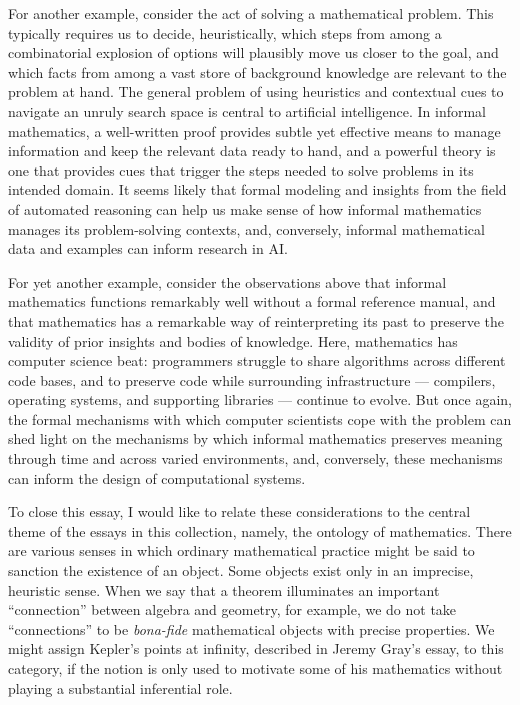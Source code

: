 \documentclass[11pt]{article}
\begin{document}
For another example, consider the act of solving a mathematical problem. This typically requires us to decide, heuristically, which steps from among a combinatorial explosion of options will plausibly move us closer to the goal, and which facts from among a vast store of background knowledge are relevant to the problem at hand. The general problem of using heuristics and contextual cues to navigate an unruly search space is central to artificial intelligence. In informal mathematics, a well-written proof provides subtle yet effective means to manage information and keep the relevant data ready to hand, and a powerful theory is one that provides cues that trigger the steps needed to solve problems in its intended domain. It seems likely that formal modeling and insights from the field of automated reasoning can help us make sense of how informal mathematics manages its problem-solving contexts, and, conversely, informal mathematical data and examples can inform research in AI.

For yet another example, consider the observations above that informal mathematics functions remarkably well without a formal reference manual, and that mathematics has a remarkable way of reinterpreting its past to preserve the validity of prior insights and bodies of knowledge. Here, mathematics has computer science beat: programmers struggle to share algorithms across different code bases, and to preserve code while surrounding infrastructure --- compilers, operating systems, and supporting libraries --- continue to evolve. But once again, the formal mechanisms with which computer scientists cope with the problem can shed light on the mechanisms by which informal mathematics preserves meaning through time and across varied environments, and, conversely, these mechanisms can inform the design of computational systems.

To close this essay, I would like to relate these considerations to the central theme of the essays in this collection, namely, the ontology of mathematics. There are various senses in which ordinary mathematical practice might be said to sanction the existence of an object. Some objects exist only in an imprecise, heuristic sense. When we say that a theorem illuminates an important ``connection'' between algebra and geometry, for example, we do not take ``connections'' to be \emph{bona-fide} mathematical objects with precise properties. We might assign Kepler's points at infinity, described in Jeremy Gray's essay, to this category, if the notion is only used to motivate some of his mathematics without playing a substantial inferential role. 
\end{document}
